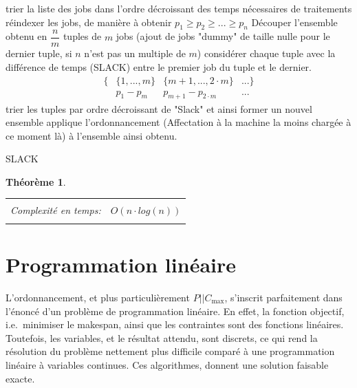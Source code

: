 \documentclass[a4paper,12pt]{report}
\theoremstyle{plain}				%
\newtheorem{theoreme}{Théorème}	%
\theoremstyle{definition}				%
\newcommand\problemGrahamP{$P||C_{\max}$\xspace}
\begin{document}
\bigskip
\begin{algorithm}[H]
\DontPrintSemicolon

trier la liste des jobs dans l'ordre décroissant des temps nécessaires de traitements \;
réindexer les jobs, de manière à obtenir $p_1 \geq p_2 \geq ... \geq p_n$ \;
Découper l'ensemble obtenu en $\dfrac{n}{m}$ tuples de $m$ jobs (ajout
de jobs "dummy" de taille nulle pour le dernier tuple, si $n$ n'est
pas un multiple de $m$) \;
considérer chaque tuple avec la différence de temps (SLACK) entre le
premier job du tuple et le dernier.
\begin{align*}
\{ &\{1, ..., m\} &\{m+1,..., 2 \cdot m\} &... \} \\
   &p_1 - p_m     &p_{m+1}-p_{2 \cdot m}  &...
\end{align*} \;
trier les tuples par ordre décroissant de "Slack" et ainsi former un nouvel ensemble
applique l'ordonnancement (Affectation à la machine la moins chargée à
ce moment là) à l'ensemble ainsi obtenu.
\caption{SLACK\label{algo:SLACK}}
\end{algorithm}

\bigskip
\begin{theoreme}
\begin{flushleft}
\begin{tabular}{|p{8cm}p{6cm}|}
\hline
& \\
Complexité en temps:& $O(n \cdot log (n))$
\\
& \\
\hline
\end{tabular}
\end{flushleft}
\end{theoreme}


\section{Programmation linéaire}

L'ordonnancement, et plus particulièrement \problemGrahamP, s'inscrit
parfaitement dans l'énoncé d'un problème de programmation linéaire.
En effet, la fonction objectif, i.e.\ minimiser le makespan, ainsi que
les contraintes sont des fonctions linéaires.
Toutefois, les variables, et le résultat attendu, sont discrets, ce qui
rend la résolution du problème nettement plus difficile comparé à une
programmation linéaire à variables continues.
Ces algorithmes, donnent une solution faisable exacte.
\end{document}
